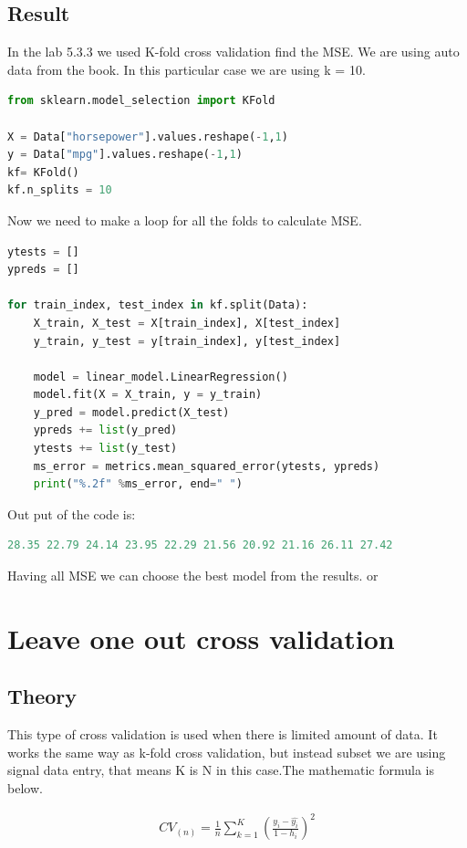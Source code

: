 \subsection{Result}
In the lab 5.3.3 we used K-fold cross validation find the MSE. We are using auto data from the book. In this particular case we are using k = 10. 
\begin{lstlisting}[language=Python]
from sklearn.model_selection import KFold

X = Data["horsepower"].values.reshape(-1,1) 
y = Data["mpg"].values.reshape(-1,1)
kf= KFold()
kf.n_splits = 10
\end{lstlisting}
Now we need to make a loop for all the folds to calculate MSE.   

\begin{lstlisting}[language=Python]
ytests = []
ypreds = []

for train_index, test_index in kf.split(Data):
	X_train, X_test = X[train_index], X[test_index]
	y_train, y_test = y[train_index], y[test_index]

	model = linear_model.LinearRegression()
	model.fit(X = X_train, y = y_train)
	y_pred = model.predict(X_test)  
	ypreds += list(y_pred)
	ytests += list(y_test)
	ms_error = metrics.mean_squared_error(ytests, ypreds)
	print("%.2f" %ms_error, end=" ")
\end{lstlisting}
Out put of the code is:
\begin{lstlisting}[language=Python]
28.35 22.79 24.14 23.95 22.29 21.56 20.92 21.16 26.11 27.42 
\end{lstlisting}
Having all MSE we can choose the best model from the results. or 

\section {Leave one out cross validation}

\subsection{Theory}
This type of cross validation is used when there is limited amount of data. It works the same way as k-fold cross validation, but instead subset we are using signal data entry, that means K is N in this case.The mathematic formula is below. 

\begin{align}\label{fo:LOOCV}
CV_{(n)} = \frac {1}{n} \sum_{k=1}^{K}  (\frac {y_i-\hat{y_i}}{1- h_i})^2
\end{align}
